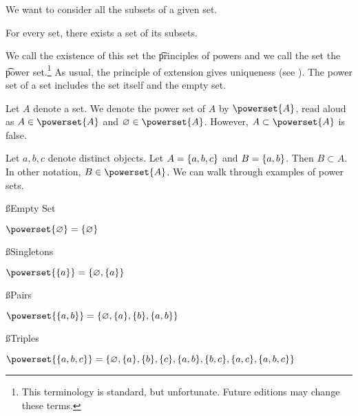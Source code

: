 

We want to consider all the subsets of a given set.

\begin{principle}[Powers]
  For every set, there exists a set of its subsets.
\end{principle}

We call the existence of this set the \t{principles of powers} and we call the set the \t{power set}.\footnote{This terminology is standard, but unfortunate. Future editions may change these terms.}
As usual, the principle of extension gives uniqueness (see ).
The power set of a set includes the set itself and the empty set.


Let $A$ denote a set.
We denote the power set of $A$ by $\powerset{A}$, read aloud as 
$A \in \powerset{A}$ and $\emptyset \in \powerset{A}$.
However, $A \subset \powerset{A}$ is false.


Let $a, b, c$ denote distinct objects. Let $A = \{a, b ,c\}$
and $B = \{a, b\}$. Then
$B \subset A$.
In other notation,
$B \in \powerset{A}$.
We can walk through examples of power sets.

\ss{Empty Set}

\begin{proposition}
  $\powerset{\emptyset} = \set{\emptyset}$
\end{proposition}

\ss{Singletons}

\begin{proposition}
  $\powerset{\set{a}} = \set{\emptyset, \set{a}}$
\end{proposition}

\ss{Pairs}

\begin{proposition}
  $\powerset{\set{a, b}} = \set{\emptyset, \set{a}, \set{b}, \set{a, b}}$
\end{proposition}

\ss{Triples}

\begin{proposition}
  $\powerset{\set{a, b, c}} =
  \{
    \emptyset,
    \set{a},
    \set{b},
    \set{c},
    \set{a, b},
    \set{b, c},
    \set{a, c},
    \set{a, b, c}
  \}$
\end{proposition}


